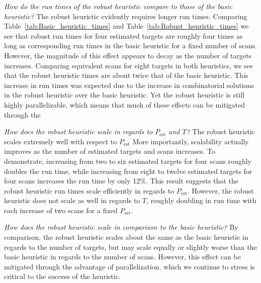 \textit{How do the run times of the robust heuristic compare to those of the basic heuristic?} The robust heuristic evidently requires longer run times. Comparing Table~\ref{tab:Basic_heuristic_times} and Table~\ref{tab:Robust_heuristic_times} we see that robust run times for four estimated targets are roughly four times as long as corresponding run times in the basic heuristic for a fixed number of scans. However, the magnitude of this effect appears to decay as the number of targets increases. Comparing equivalent scans for eight targets in both heuristics, we see that the robust heuristic times are about twice that of the basic heuristic. This increase in run times was expected due to the increase in combinatorial solutions in the robust heuristic over the basic heuristic. Yet the robust heuristic is still highly parallelizable, which means that much of these effects can be mitigated through the 

\textit{How does the robust heuristic scale in regards to $P_{\text{est}}$ and $T$?} The robust heuristic scales extremely well with respect to $P_{\text{est}}$ More importantly, scalability actually improves as the number of estimated targets and scans increases. To demonstrate, increasing from two to six estimated targets for four scans roughly doubles the run time, while increasing from eight to twelve estimated targets for four scans increases the run time by only 12\%. This result suggests that the robust heuristic run times scale efficiently in regards to $P_{\text{est}}$. However, the robust heuristic does not scale as well in regards to $T$, roughly doubling in run time with each increase of two scans for a fixed $P_{\text{est}}$. 

\textit{How does the robust heuristic scale in comparison to the basic heuristic?} By comparison, the robust heuristic scales about the same as the basic heuristic in regards to the number of targets, but may scale equally or slightly worse than the basic heuristic in regards to the number of scans. However, this effect can be mitigated through the advantage of parallelization, which we continue to stress is critical to the success of the heuristic. 


